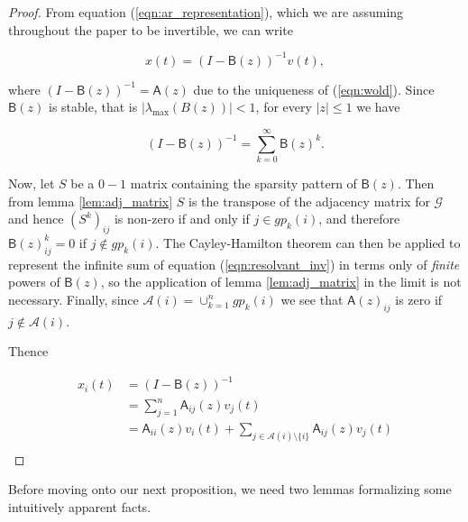 \documentclass[12pt]{article}
\def\gcg{\mathcal{G}}  %
\def\B{\mathsf{B}}  %
\def\A{\mathsf{A}}  %
\newcommand{\anc}[1]{\mathcal{A}(#1)}  %
\newcommand{\gpn}[2]{gp_{#1}(#2)}  %
\begin{document}
\begin{proof}
  From equation (\ref{eqn:ar_representation}), which we are assuming
  throughout the paper to be invertible, we can write

  \begin{equation*}
    x(t) = (I - \B(z))^{-1} v(t),
  \end{equation*}

  where $(I - \B(z))^{-1} = \A(z)$ due to the uniqueness of
  (\ref{eqn:wold}).  Since $\B(z)$ is stable, that is
  $|\lambda_{\text{max}}(B(z))| < 1$, for every $|z| \le 1$ we have

  \begin{equation}
    \label{eqn:resolvant_inv}
    (I - \B(z))^{-1} = \sum_{k = 0}^\infty \B(z)^k.
  \end{equation}

  Now, let $S$ be a $0-1$ matrix containing the sparsity pattern of
  $\B(z)$.  Then from lemma \ref{lem:adj_matrix} $S$ is the transpose
  of the adjacency matrix for $\gcg$ and hence $(S^k)_{ij}$ is
  non-zero if and only if $j \in \gpn{k}{i}$, and therefore
  $\B(z)^k_{ij} = 0$ if $j \not \in \gpn{k}{i}$.  The Cayley-Hamilton
  theorem can then be applied to represent the infinite sum of equation
  (\ref{eqn:resolvant_inv}) in terms only of \textit{finite} powers of
  $\B(z)$, so the application of lemma \ref{lem:adj_matrix} in the
  limit is not necessary.  Finally, since $\anc{i} = \cup_{k = 1}^n\gpn{k}{i}$
  we see that $\A(z)_{ij}$ is zero if $j \not\in \anc{i}$.

  Thence

  \begin{align*}
    x_i(t) &= (I - \B(z))^{-1}\\
    &= \sum_{j = 1}^n \A_{ij}(z) v_j(t)\\
    &= \A_{ii}(z) v_i(t) + \sum_{j \in \anc{i} \setminus \{i\}} \A_{ij}(z) v_j(t)\\
  \end{align*}
\end{proof}

Before moving onto our next proposition, we need two lemmas formalizing
some intuitively apparent facts.
\end{document}
